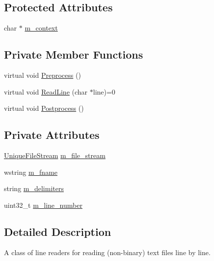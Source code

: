 \subsection*{Protected Attributes}
\begin{DoxyCompactItemize}
\item 
char $\ast$ \hyperlink{classmage_1_1_line_reader_a2f1cfe313dc89741386178e63a6b8b0c}{m\+\_\+context}
\end{DoxyCompactItemize}
\subsection*{Private Member Functions}
\begin{DoxyCompactItemize}
\item 
virtual void \hyperlink{classmage_1_1_line_reader_a4de135cfb0434be786cfcfd7959031ef}{Preprocess} ()
\item 
virtual void \hyperlink{classmage_1_1_line_reader_acfb2f7279ec77d070a86d7db812d4745}{Read\+Line} (char $\ast$line)=0
\item 
virtual void \hyperlink{classmage_1_1_line_reader_adfde21013140a1058d3dd567204abfb5}{Postprocess} ()
\end{DoxyCompactItemize}
\subsection*{Private Attributes}
\begin{DoxyCompactItemize}
\item 
\hyperlink{namespacemage_a679c1b707dee02c7eab8d706ef14411a}{Unique\+File\+Stream} \hyperlink{classmage_1_1_line_reader_a510ff5355c6d26d7c29dc692ef18a3e2}{m\+\_\+file\+\_\+stream}
\item 
wstring \hyperlink{classmage_1_1_line_reader_ad6f55ba12fc610ab2fc1c26a48d12321}{m\+\_\+fname}
\item 
string \hyperlink{classmage_1_1_line_reader_a6de3398ac59fdd98f8c40cff6f5c1075}{m\+\_\+delimiters}
\item 
uint32\+\_\+t \hyperlink{classmage_1_1_line_reader_ada0b4ec5817b96c6b1bb43bd2573f8ba}{m\+\_\+line\+\_\+number}
\end{DoxyCompactItemize}


\subsection{Detailed Description}
A class of line readers for reading (non-\/binary) text files line by line. 

